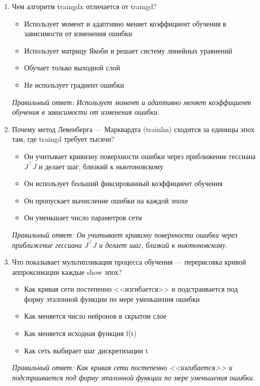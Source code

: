 \begin{enumerate}[label=\textbf{\arabic*.}, leftmargin=0pt, itemsep=1.2em]
\item Чем алгоритм traingdx отличается от traingd?
\begin{itemize}[label=$\square$, leftmargin=1.5cm, itemsep=0.2em, topsep=0.3em]
\item Использует момент и адаптивно меняет коэффициент обучения в зависимости от изменения ошибки
\item Использует матрицу Якоби и решает систему линейных уравнений
\item Обучает только выходной слой
\item Не использует градиент ошибки
\end{itemize}
{\small\textit{Правильный ответ: Использует момент и адаптивно меняет коэффициент обучения в зависимости от изменения ошибки.}}

\item Почему метод Левенберга — Марквардта (trainlm) сходится за единицы эпох там, где traingd требует тысячи?
\begin{itemize}[label=$\square$, leftmargin=1.5cm, itemsep=0.2em, topsep=0.3em]
\item Он учитывает кривизну поверхности ошибки через приближение гессиана $J^{\top}J$ и делает шаг, близкий к ньютоновскому
\item Он использует больший фиксированный коэффициент обучения
\item Он пропускает вычисление ошибки на каждой эпохе
\item Он уменьшает число параметров сети
\end{itemize}
{\small\textit{Правильный ответ: Он учитывает кривизну поверхности ошибки через приближение гессиана $J^{\top}J$ и делает шаг, близкий к ньютоновскому.}}

\item Что показывает мультипликация процесса обучения — перерисовка кривой аппроксимации каждые show эпох?
\begin{itemize}[label=$\square$, leftmargin=1.5cm, itemsep=0.2em, topsep=0.3em]
\item Как кривая сети постепенно <<изгибается>> и подстраивается под форму эталонной функции по мере уменьшения ошибки
\item Как меняется число нейронов в скрытом слое
\item Как меняется исходная функция f(t)
\item Как сеть выбирает шаг дискретизации t
\end{itemize}
{\small\textit{Правильный ответ: Как кривая сети постепенно <<изгибается>> и подстраивается под форму эталонной функции по мере уменьшения ошибки.}}


\end{enumerate}
